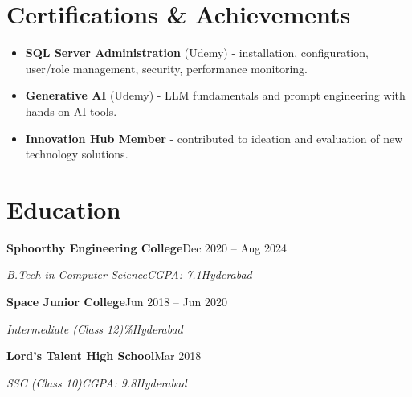 \documentclass[a4paper,10pt]{article}
\newcommand{\resumeSubheading}[4]{%
  \Needspace{5\baselineskip}%
  \textbf{#1}\hfill #2\par
  \textit{#3}\hfill \textit{#4}\par
}
\newenvironment{resumeItems}{%
  \begin{itemize}[leftmargin=14pt,label=\textbullet,
    labelsep=5pt,topsep=3pt,itemsep=3pt,parsep=0pt,partopsep=0pt]
}{\end{itemize}\vspace{3pt}}
\begin{document}
\section{Certifications \& Achievements}
\begin{resumeItems}
  \item \textbf{SQL Server Administration} (Udemy) - installation, configuration, user/role management, security, performance monitoring.
  \item \textbf{Generative AI} (Udemy) - LLM fundamentals and prompt engineering with hands-on AI tools.
  \item \textbf{Innovation Hub Member} - contributed to ideation and evaluation of new technology solutions.
\end{resumeItems}

\section{Education}
\resumeSubheading
  {Sphoorthy Engineering College}{Dec 2020 -- Aug 2024}
  {B.Tech in Computer Science\enspace\textbar\enspace CGPA: 7.1}{Hyderabad}
\resumeSubheading
  {Space Junior College}{Jun 2018 -- Jun 2020}
  {Intermediate (Class 12)\enspace\textbar\enspace 95\%}{Hyderabad}
\resumeSubheading
  {Lord's Talent High School}{Mar 2018}
  {SSC (Class 10)\enspace\textbar\enspace CGPA: 9.8}{Hyderabad}
\end{document}
